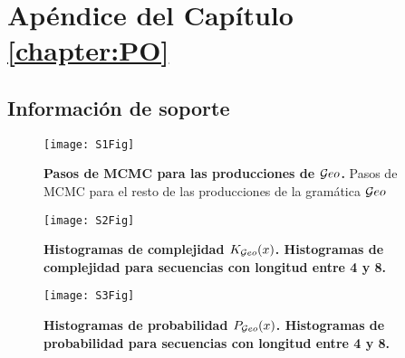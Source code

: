 \chapter{Apéndice del Capítulo \ref{chapter:PO}}

\section{Información de soporte}

\begin{figure}[htpb]
    \centering
    \texttt{[image: S1Fig]}
    \caption{{\bf Pasos de MCMC para las producciones de $\mathcal Geo$.} Pasos de MCMC para el resto de las producciones de la gramática $\mathcal Geo$}
    \label{S1_Fig}
\end{figure}

\begin{figure}[htpb]
    \centering
    \texttt{[image: S2Fig]}
    \caption{\bf{Histogramas de complejidad $K_{\mathcal Geo}(x)$}. Histogramas de complejidad para secuencias con longitud entre 4 y 8.}
    \label{S2_Fig}
\end{figure}

\begin{figure}[htpb]
    \centering
    \texttt{[image: S3Fig]}
    \caption{\bf{Histogramas de probabilidad $P_{\mathcal Geo}(x)$}. Histogramas de probabilidad para secuencias con longitud entre 4 y 8.}
    \label{S3_Fig}
\end{figure}